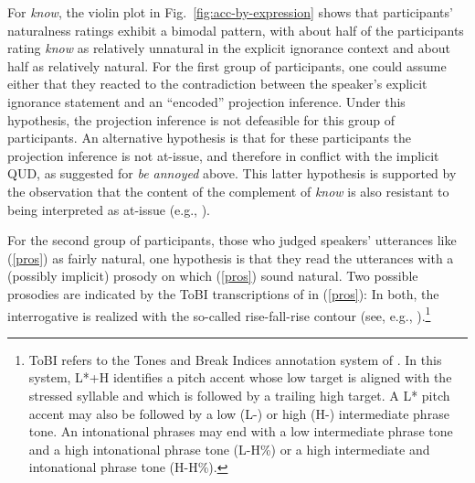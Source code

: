 \documentclass[11pt,fleqn]{article}
\newcommand{\6}{\mbox{$[\hspace*{-.6mm}[$}}
\newcommand{\9}{\mbox{$]\hspace*{-.6mm}]$}}
\begin{document}
For \emph{know}, the violin plot in Fig.~\ref{fig:acc-by-expression} shows that participants' naturalness ratings exhibit a bimodal pattern, with about half of the participants rating \emph{know} as relatively unnatural in the explicit ignorance context and about half as relatively natural. For the first group of participants, one could assume either that they reacted to the contradiction between the speaker's explicit ignorance statement and an ``encoded'' projection inference. Under this hypothesis, the projection inference is not defeasible for this group of participants. An alternative hypothesis is that for these participants the projection inference is not at-issue, and therefore in conflict with the implicit QUD, as suggested for \emph{be annoyed} above. This latter hypothesis is supported by the observation that the content of the complement of \emph{know} is also resistant to being interpreted as at-issue (e.g., \citealt{simons07,tbd-variability}).

For the second group of participants, those who judged speakers' utterances like (\ref{pros}) as fairly natural, one hypothesis is that they read the utterances with a (possibly implicit) prosody on which (\ref{pros}) sound natural.  Two possible prosodies are indicated by the ToBI transcriptions of in (\ref{pros}): In both, the interrogative is realized with the so-called rise-fall-rise contour (see, e.g., \citealt{ward-hirschberg85,buering97,buering03,wagner-etal2013}).\footnote{ToBI refers to the Tones and Break Indices annotation system of \citealt{beckman-ayers97}. In this system, L*+H identifies a pitch accent whose low target is aligned with the stressed syllable and which is followed by a trailing high target. A L* pitch accent may also be followed by a low (L-) or high (H-) intermediate phrase tone. An intonational phrases may end with a low intermediate phrase tone and a high intonational phrase tone (L-H\%) or a high intermediate and intonational phrase tone (H-H\%).} 
\end{document}

